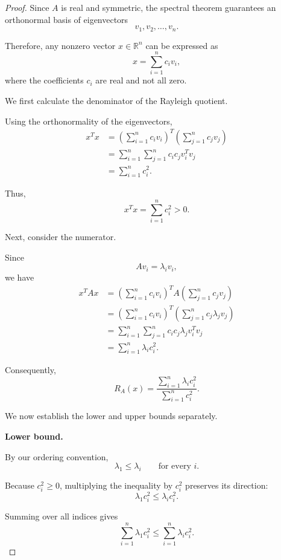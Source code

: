 \documentclass[14pt,letterpaper]{article}
\theoremstyle{plain}
\theoremstyle{definition}
\theoremstyle{remark}
\newcommand{\R}{\mathbb{R}}
\begin{document}
\begin{proof}

Since $A$ is real and symmetric, the
spectral theorem guarantees an
orthonormal basis of eigenvectors
\[
v_1,v_2,\ldots,v_n.
\]

Therefore, any nonzero vector
$x\in\R^n$ can be expressed as
\[
\boxed{
x=\sum_{i=1}^{n}c_i v_i,
}
\]
where the coefficients $c_i$ are real
and not all zero.

We first calculate the denominator
of the Rayleigh quotient.

Using the orthonormality of the
eigenvectors,
\[
\begin{aligned}
x^Tx
&=
\left(\sum_{i=1}^{n}c_i v_i\right)^T
\left(\sum_{j=1}^{n}c_j v_j\right)\\[4pt]
&=
\sum_{i=1}^{n}
\sum_{j=1}^{n}
c_i c_j v_i^Tv_j\\[4pt]
&=
\sum_{i=1}^{n}c_i^2.
\end{aligned}
\]

Thus,
\[
\boxed{
x^Tx=\sum_{i=1}^{n}c_i^2>0.
}
\]

Next, consider the numerator.

Since
\[
Av_i=\lambda_i v_i,
\]
we have
\[
\begin{aligned}
x^TAx
&=
\left(\sum_{i=1}^{n}c_i v_i\right)^T
A\left(\sum_{j=1}^{n}c_j v_j\right)\\[4pt]
&=
\left(\sum_{i=1}^{n}c_i v_i\right)^T
\left(\sum_{j=1}^{n}
c_j\lambda_j v_j\right)\\[4pt]
&=
\sum_{i=1}^{n}
\sum_{j=1}^{n}
c_i c_j\lambda_j v_i^Tv_j\\[4pt]
&=
\sum_{i=1}^{n}\lambda_i c_i^2.
\end{aligned}
\]

Consequently,
\[
\boxed{
R_A(x)
=
\frac{
\displaystyle\sum_{i=1}^{n}\lambda_i c_i^2
}{
\displaystyle\sum_{i=1}^{n}c_i^2
}.
}
\]

We now establish the lower and upper
bounds separately.

\medskip

\noindent
\textbf{Lower bound.}

By our ordering convention,
\[
\lambda_1\leq\lambda_i
\qquad
\text{for every }i.
\]

Because $c_i^2\geq0$, multiplying
the inequality by $c_i^2$ preserves
its direction:
\[
\lambda_1c_i^2\leq\lambda_i c_i^2.
\]

Summing over all indices gives
\[
\sum_{i=1}^{n}\lambda_1c_i^2
\leq
\sum_{i=1}^{n}\lambda_i c_i^2.
\]


\end{proof}
\end{document}
